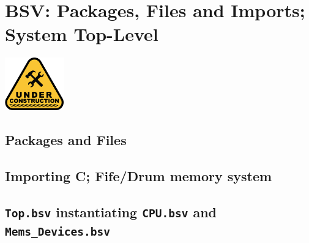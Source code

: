 

\chapter{BSV: Packages, Files and Imports; System Top-Level }


\setcounter{page}{1}
\renewcommand{\thepage}{\arabic{chapter}-\arabic{page}}

\label{ch_Packages}


\vspace{2ex}

\centerline{\includegraphics[width=1in,angle=0]{Figures/Fig_Under_Construction}}

\vspace{2ex}


\section{Packages and Files}

\section{Importing C; Fife/Drum memory system}

\section{{\tt Top.bsv} instantiating {\tt CPU.bsv} and {\tt Mems\_Devices.bsv}}

